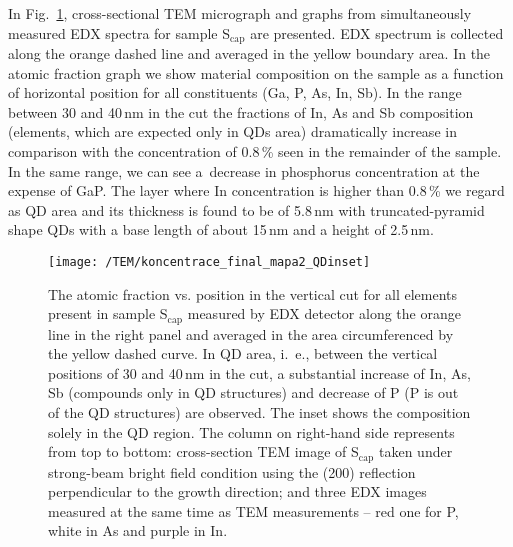 In Fig.~\ref{fig:TEM}, cross-sectional TEM micrograph and graphs from simultaneously measured EDX spectra for sample S$_\mathrm{cap}$ are presented. EDX spectrum is collected along the orange dashed line and averaged in the yellow boundary area. In the atomic fraction graph we show material composition on the sample as a function of horizontal position for all constituents (Ga, P, As, In, Sb). In the range between 30 and 40$\,$nm in the cut the fractions of In, As and Sb composition (elements, which are expected only in QDs area) dramatically increase in comparison with the concentration of 0.8$\,$\% seen in the remainder of the sample. In the same range, we can see a~decrease in phosphorus concentration at the expense of GaP. The layer where In concentration is higher than 0.8$\,$\% we regard as QD area and its thickness is found to be of 5.8$\,$nm with truncated-pyramid shape QDs with a base length of about 15$\,$nm and a height of 2.5$\,$nm. 
\begin{figure}
	\centering
	\texttt{[image: /TEM/koncentrace\_final\_mapa2\_QDinset]}
	\caption{The atomic fraction vs. position in the vertical cut for all elements present in sample S$_\mathrm{cap}$ measured by EDX detector along the orange line in the right panel and averaged in the area circumferenced by the yellow dashed curve. In QD area, i.~e., between the vertical positions of 30 and 40$\,$nm in the cut, a substantial increase of In, As, Sb (compounds only in QD structures) and decrease of P (P is out of the QD structures) are observed. The inset shows the composition solely in the QD region. The column on right-hand side represents from top to bottom: cross-section TEM image of S$_\mathrm{cap}$ taken under strong-beam bright field condition using the (200) reflection perpendicular to the growth direction; and three EDX images measured at the same time as TEM measurements -- red one for P, white in As and purple in In.}
	\label{fig:TEM}
\end{figure}

